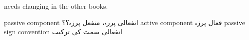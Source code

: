 needs changing in the other books.

passive component انفعالی پرزہ، منفعل پرزہ؟؟
active component فعال پرزہ
passive sign convention انفعالی سمت کی ترکیب



